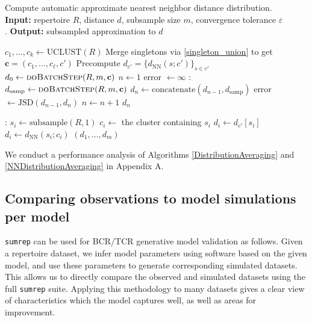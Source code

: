 \documentclass{article}
\begin{document}
\begin{algorithm}
    \caption{Compute automatic approximate nearest neighbor distance distribution.\\
        \textbf{Input:} repertoire $R$, distance $d$, subsample size $m$, convergence tolerance $\varepsilon$\\.
        \textbf{Output:} subsampled approximation to $d$}
    \label{NNDistributionAveraging}
    \begin{algorithmic}
    	\State $c_1, \dotsc, c_k \gets \text{UCLUST}(R)$
		\State Merge singletons via \eqref{singleton_union} to get $\mathbf c = (c_1, \dotsc, c_\ell, c')$
		\State Precompute $d_{c'} = \{d_\text{NN}(s; c')\}_{s \in c'}$
        \State $d_0 \gets \Call{doBatchStep}{R, m, \mathbf c}$
        \State $n \gets 1$
        \State error $\gets \infty$
        :
        	\State $d_\text{samp} \gets \Call{doBatchStep}{R, m, \mathbf c}$
        	\State $d_n \gets \text{concatenate}(d_{n-1}, d_\text{samp})$
        	\State error $\gets \text{JSD}(d_{n-1}, d_n)$
        	\State $n \gets n + 1$
        \EndWhile
            \Return $d_n$
    \end{algorithmic}
    \begin{algorithmic}
    :
		\State $s_i \gets \text{subsample}(R, 1)$
		\State $c_i \gets$ the cluster containing $s_i$
			\State $d_i \gets d_{c'}[s_i]$
		\Else
			\State $d_i \gets d_\text{NN}(s_i; c_i)$
		\EndIf
	\EndFor
	\Return $(d_1, \dotsc, d_m)$
	\EndFunction
    \end{algorithmic}
\end{algorithm}

We conduct a performance analysis of Algorithms \ref{DistributionAveraging} and \ref{NNDistributionAveraging} in Appendix A.


\subsection*{Comparing observations to model simulations per model}
\texttt{sumrep} can be used for BCR/TCR generative model validation as follows.
Given a repertoire dataset, we infer model parameters using software based on the given model, and use these parameters to generate corresponding simulated datasets.
This allows us to directly compare the observed and simulated datasets using the full \texttt{sumrep} suite.
Applying this methodology to many datasets gives a clear view of characteristics which the model captures well, as well as areas for improvement.
\end{document}
